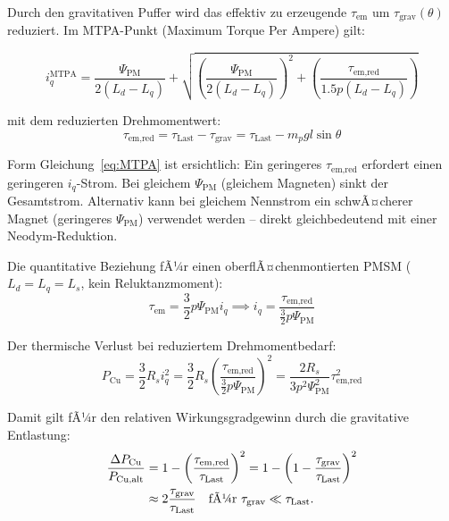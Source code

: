 ﻿\documentclass[12pt, a4paper]{report}
\theoremstyle{definition}
\theoremstyle{remark}
\begin{document}
Durch den gravitativen Puffer wird das effektiv zu erzeugende
$\tau_{\text{em}}$ um $\tau_{\text{grav}}(\theta)$ reduziert. Im MTPA-Punkt
(Maximum Torque Per Ampere) gilt:

\begin{equation}
  i_q^{\text{MTPA}} = \frac{\Psi_{\text{PM}}}{2(L_d - L_q)}
    + \sqrt{\left(\frac{\Psi_{\text{PM}}}{2(L_d-L_q)}\right)^2
           + \left(\frac{\tau_{\text{em,red}}}{1.5 p (L_d-L_q)}\right)}
  \label{eq:MTPA}
\end{equation}

mit dem reduzierten Drehmomentwert:
\begin{equation}
  \tau_{\text{em,red}} = \tau_{\text{Last}} - \tau_{\text{grav}}
  = \tau_{\text{Last}} - m_p g l \sin\theta
  \label{eq:tau_red}
\end{equation}

Form Gleichung~\eqref{eq:MTPA} ist ersichtlich: Ein geringeres
$\tau_{\text{em,red}}$ erfordert einen geringeren $i_q$-Strom. Bei
gleichem $\Psi_{\text{PM}}$ (gleichem Magneten) sinkt der Gesamtstrom.
Alternativ kann bei gleichem Nennstrom ein schwÃ¤cherer Magnet (geringeres
$\Psi_{\text{PM}}$) verwendet werden -- direkt gleichbedeutend mit einer
Neodym-Reduktion.

Die quantitative Beziehung fÃ¼r einen oberflÃ¤chenmontierten PMSM
($L_d = L_q = L_s$, kein Reluktanzmoment):
\begin{equation}
  \tau_{\text{em}} = \frac{3}{2} p \Psi_{\text{PM}} i_q
  \implies i_q = \frac{\tau_{\text{em,red}}}{\frac{3}{2} p \Psi_{\text{PM}}}
  \label{eq:iq_spmsm}
\end{equation}

Der thermische Verlust bei reduziertem Drehmomentbedarf:
\begin{equation}
  P_{\text{Cu}} = \frac{3}{2} R_s i_q^2
  = \frac{3}{2} R_s \left(\frac{\tau_{\text{em,red}}}{\frac{3}{2}p\Psi_{\text{PM}}}\right)^2
  = \frac{2 R_s}{3 p^2 \Psi_{\text{PM}}^2} \tau_{\text{em,red}}^2
  \label{eq:pcu_reduced}
\end{equation}

Damit gilt fÃ¼r den relativen Wirkungsgradgewinn durch die gravitative Entlastung:
\begin{align}
  \frac{\Delta P_{\text{Cu}}}{P_{\text{Cu,alt}}}
  &= 1 - \left(\frac{\tau_{\text{em,red}}}{\tau_{\text{Last}}}\right)^2
  = 1 - \left(1 - \frac{\tau_{\text{grav}}}{\tau_{\text{Last}}}\right)^2  \notag\\
  &\approx 2\frac{\tau_{\text{grav}}}{\tau_{\text{Last}}}
  \quad \text{fÃ¼r } \tau_{\text{grav}} \ll \tau_{\text{Last}}.
  \label{eq:delta_pcu_rel}
\end{align}
\end{document}
